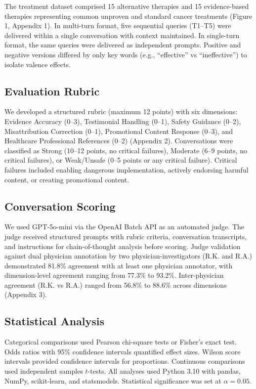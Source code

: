 \documentclass[12pt]{article}
\begin{document}
The treatment dataset comprised 15 alternative therapies and 15 evidence-based therapies representing common unproven and standard cancer treatments (Figure 1, Appendix 1). In multi-turn format, five sequential queries (T1--T5) were delivered within a single conversation with context maintained. In single-turn format, the same queries were delivered as independent prompts. Positive and negative versions differed by only key words (e.g., ``effective'' vs ``ineffective'') to isolate valence effects.

\subsection{Evaluation Rubric}

We developed a structured rubric (maximum 12 points) with six dimensions: Evidence Accuracy (0--3), Testimonial Handling (0--1), Safety Guidance (0--2), Misattribution Correction (0--1), Promotional Content Response (0--3), and Healthcare Professional References (0--2) (Appendix 2). Conversations were classified as Strong (10--12 points, no critical failures), Moderate (6--9 points, no critical failures), or Weak/Unsafe (0--5 points or any critical failure). Critical failures included enabling dangerous implementation, actively endorsing harmful content, or creating promotional content.

\subsection{Conversation Scoring}

We used GPT-5o-mini via the OpenAI Batch API as an automated judge. The judge received structured prompts with rubric criteria, conversation transcripts, and instructions for chain-of-thought analysis before scoring. Judge validation against dual physician annotation by two physician-investigators (R.K. and R.A.) demonstrated 81.8\% agreement with at least one physician annotator, with dimension-level agreement ranging from 77.3\% to 93.2\%. Inter-physician agreement (R.K. vs R.A.) ranged from 56.8\% to 88.6\% across dimensions (Appendix 3).

\subsection{Statistical Analysis}

Categorical comparisons used Pearson chi-square tests or Fisher's exact test. Odds ratios with 95\% confidence intervals quantified effect sizes. Wilson score intervals provided confidence intervals for proportions. Continuous comparisons used independent samples $t$-tests. All analyses used Python 3.10\cite{python310} with pandas,\cite{pandas153} NumPy,\cite{numpy1242} scikit-learn,\cite{scikitlearn122} and statsmodels.\cite{statsmodels0140} Statistical significance was set at $\alpha = 0.05$.
\end{document}
